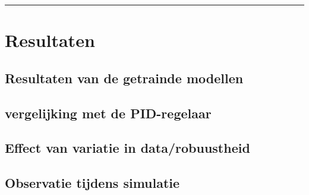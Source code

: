 \vspace{0.2cm}
{\color{gray}\hrule}
\section{Resultaten}



\subsection{Resultaten van de getrainde modellen}

\subsection{vergelijking met de PID-regelaar}

\subsection{Effect van variatie in data/robuustheid}

\subsection{Observatie tijdens simulatie}



